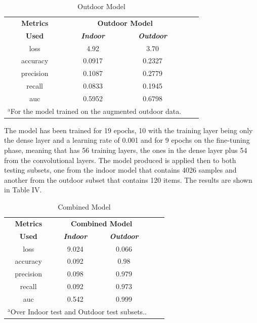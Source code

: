 \documentclass[conference]{IEEEtran}
\begin{document}
\begin{table}[htbp]
\caption{Outdoor Model}
\begin{center}
\begin{tabular}{|c|c|c|c|c|}
\hline
\textbf{Metrics}&\multicolumn{2}{|c|}{\textbf{Outdoor Model}} \\
\cline{2-3} 
\textbf{Used} & \textbf{\textit{Indoor}}& \textbf{\textit{Outdoor}} \\
\hline
loss  &4.92 &3.70  \\
\hline
accuracy  &0.0917 &0.2327 \\
\hline
precision  &0.1087 &0.2779 \\
\hline
recall  &0.0833 &0.1945 \\
\hline
auc  &0.5952 &0.6798  \\
\hline
\multicolumn{3}{l}{$^{\mathrm{a}}$For the model trained on the augmented outdoor data.}
\end{tabular}
\label{tab1}
\end{center}
\end{table}

The model has been trained for 19 epochs, 10 with the training layer being only the dense layer and a learning rate of 0.001 and for 9 epochs on the fine-tuning phase, meaning that has 56 training layers, the ones in the dense layer plus 54 from the convolutional layers. The model produced is applied then to both testing subsets, one from the indoor model that contains 4026 samples and another from the outdoor subset  that contains 120 items. The results are shown in Table IV.
\begin{table}[htbp]
\caption{Combined Model}
\begin{center}
\begin{tabular}{|c|c|c|c|c|}
\hline
\textbf{Metrics}&\multicolumn{2}{|c|}{\textbf{Combined Model}} \\
\cline{2-3} 
\textbf{Used} & \textbf{\textit{Indoor}}& \textbf{\textit{Outdoor}} \\
\hline
loss  &9.024 &0.066   \\
\hline
accuracy  &0.092 &0.98  \\
\hline
precision  &0.098 &0.979  \\
\hline
recall  &0.092 &0.973  \\
\hline
auc  &0.542 &0.999   \\
\hline
\multicolumn{3}{l}{$^{\mathrm{a}}$Over Indoor test and Outdoor test subsets..}
\end{tabular}
\label{tab1}
\end{center}
\end{table}
\end{document}
